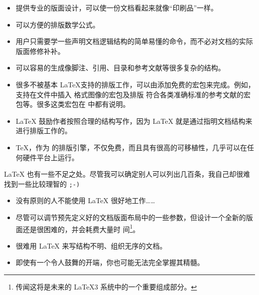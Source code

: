 \begin{itemize}

\item 提供专业的版面设计，可以使一份文档看起来就像“印刷品”一样。
\item 可以方便的排版数学公式。
\item
用户只需要学一些声明文档逻辑结构的简单易懂的命令，而不必对文档的实际版面修修补补。
\item 可以容易的生成像脚注、引用、目录和参考文献等很多复杂的结构。
\item 很多不被基本 \LaTeX 支持的排版工作，可以由添加免费的宏包来完成。例如，支持在文件中插入 \PSi{} 格式图像的宏包及排版
符合各类准确标准的参考文献的宏包等。很多这类宏包在 \companion 中都有说明。
\item
\LaTeX{} 鼓励作者按照合理的结构写作，因为 \LaTeX{} 就是通过指明文档结构来进行排版工作的。
\item \TeX{}，作为 \LaTeXe 的排版引擎，不仅免费，而且具有很高的可移植性，几乎可以在任何硬件平台上运行。

%
%
\end{itemize}

\medskip


\noindent\LaTeX{} 也有一些不足之处。尽管我可以确定别人可以列出几百条，我自己却很难找到一些比较理智的 \texttt{;-)}


\begin{itemize}
\item 没有原则的人不能使用 \LaTeX{} 很好地工作……
\item 尽管可以调节预先定义好的文档版面布局中的一些参数，但设计一个全新的版面还是很困难的，并会耗费大量时
间\footnote{传闻这将是未来的 \LaTeX 3 系统中的一个重要组成部分。}。
\item 很难用 \LaTeX{} 来写结构不明、组织无序的文档。
\item 即使有一个令人鼓舞的开端，你也可能无法完全掌握其精髓。
\end{itemize}

